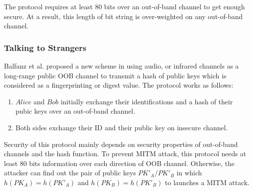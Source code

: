 The protocol requires at least 80 bits over an out-of-band channel to get enough secure. At a result, this length of bit string is over-weighted on any out-of-band channel. 
 
\subsubsection{Talking to Strangers}

Balfanz et al. proposed a new scheme in \cite{Smetters02talkingto} using audio, or infrared channels as a long-range public OOB channel to transmit a hash of public keys which is considered as a fingerprinting or digest value. The protocol works as follows:
\begin{enumerate}
\item $Alice$ and $Bob$ initially exchange their identifications and a hash of their pubic keys over an out-of-band channel.
\item Both sides exchange their ID and their public key on insecure channel. 
\end{enumerate}

\begin{center}
\end{center}

Security of this protocol mainly depends on security properties of out-of-band channels and the hash function. To prevent MITM attack, this protocol needs at least 80 bits information over each direction of OOB channel. Otherwise, the attacker can find out the pair of public keys $PK'_A/PK'_B$ in which $h(PK_A) = h(PK'_A)$ and $h(PK_B) = h(PK'_B)$ to launches a MITM attack.

